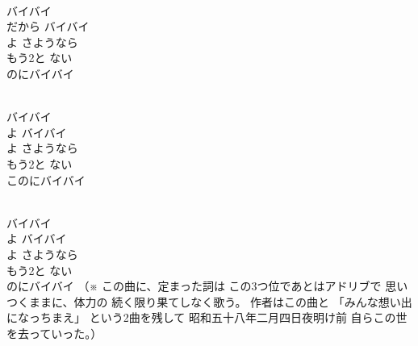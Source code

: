 \documentclass[10pt,b5j]{tarticle} %
\begin{document}
\vspace{1.5em} %
\newcommand{\linespace}{0.5em} %
\newcommand{\blocksize}{0.5\hsize} %
\newcommand{\itemmargin}{6em} %
\begin{enumerate} %
    \setlength{\itemindent}{\itemmargin} %
    \begin{minipage}[c]{\blocksize}
    
        \vspace{\linespace}
        \item~\\
        バイバイ\\
        だから バイバイ\\
        よ さようなら\\
        もう2と ない\\
        のにバイバイ
        
        \vspace{\linespace}
        \item~\\
        バイバイ\\
        よ バイバイ\\
        よ さようなら\\
        もう2と ない\\
        このにバイバイ
        
        \vspace{\linespace}
        \item~\\
        バイバイ\\
        よ バイバイ\\
        よ さようなら\\
        もう2と ない\\
        のにバイバイ
        （※
        この曲に、定まった詞は
        この3つ位であとはアドリブで
        思いつくままに、体力の
        続く限り果てしなく歌う。
        作者はこの曲と
        「みんな想い出になっちまえ」
        という2曲を残して
        昭和五十八年二月四日夜明け前
        自らこの世を去っていった。）
    
    \end{minipage}
\end{enumerate} %
\end{document}
